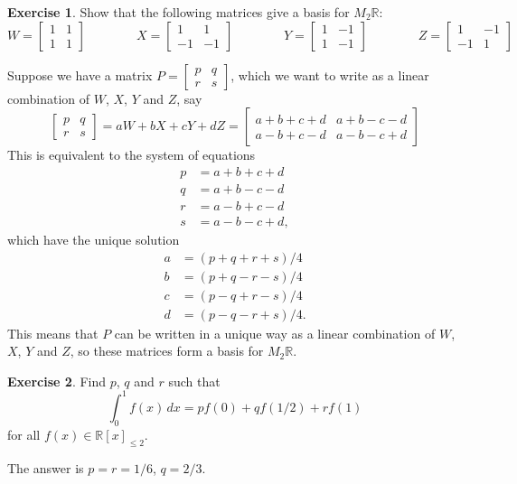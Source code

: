 \documentclass{amsart}
\newcommand{\R}         {{\mathbb{R}}}
\newcommand{\bpm}       {\left[\begin{matrix}}
\newcommand{\epm}       {\end{matrix}\right]}
\renewcommand{\:}{\colon}
\theoremstyle{definition}
\newtheorem{exercise}{Exercise}
\newenvironment{solution}{{\noindent \bf Solution:}}{}
\begin{document}
\begin{exercise}
 Show that the following matrices give a basis for $M_2\R$:
 \[ W = \bpm 1&1\\1&1\epm \hspace{4em}
    X = \bpm 1&1\\-1&-1\epm \hspace{4em}
    Y = \bpm 1&-1\\1&-1\epm \hspace{4em}
    Z = \bpm 1&-1\\-1&1\epm
 \]
\end{exercise}
\begin{solution}
 Suppose we have a matrix $P=\bpm p&q\\ r&s\epm$, which we want to
 write as a linear combination of $W$, $X$, $Y$ and $Z$, say
 \[ \bpm p&q\\ r&s\epm = aW+bX+cY+dZ =
     \bpm a+b+c+d & a+b-c-d \\ a-b+c-d & a-b-c+d \epm
 \]
 This is equivalent to the system of equations
 \begin{align*}
  p &= a+b+c+d \\
  q &= a+b-c-d \\
  r &= a-b+c-d \\
  s &= a-b-c+d,
 \end{align*}
 which have the unique solution
 \begin{align*}
  a &= (p+q+r+s)/4 \\
  b &= (p+q-r-s)/4 \\
  c &= (p-q+r-s)/4 \\
  d &= (p-q-r+s)/4.
 \end{align*}
 This means that $P$ can be written in a unique way as a linear
 combination of $W$, $X$, $Y$ and $Z$, so these matrices form a
 basis for $M_2\R$.
\end{solution}

\begin{exercise}
 Find $p$, $q$ and $r$ such that
 \[ \int_0^1 f(x)\,dx = p f(0) + q f(1/2) + r f(1) \]
 for all $f(x)\in\R[x]_{\leq 2}$.
\end{exercise}
\begin{solution}
 The answer is $p=r=1/6$, $q=2/3$.
\end{solution}
\end{document}
